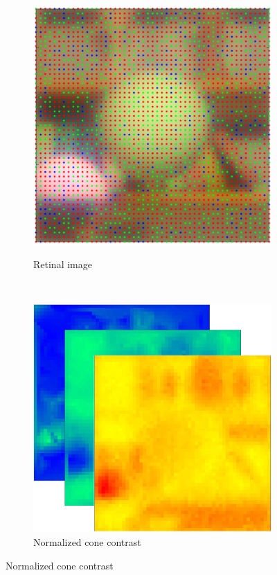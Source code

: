 \documentclass{jov}
\begin{document}
\begin{figure}
\begin{subfigure}[b]{0.19 \textwidth}
        \label{fig:croppedImage}
    \end{subfigure}
    ~ 
    \begin{subfigure}[b]{0.19 \textwidth}
    \hspace{0.1 \textwidth}
        \caption{Retinal image}
        \vspace{1.5mm}
        \includegraphics[width=\textwidth]{../FiguresDraft5/Figure9/Figure9_c.png}
        \label{fig:croppedImageWithMosaic}
    \end{subfigure}
    ~
    \begin{subfigure}[b]{0.2 \textwidth}
        \caption{Normalized cone contrast}
        \includegraphics[width=\textwidth]{../FiguresDraft5/Figure9/Figure9_d.png}

\end{subfigure}
\end{figure}
\end{document}
